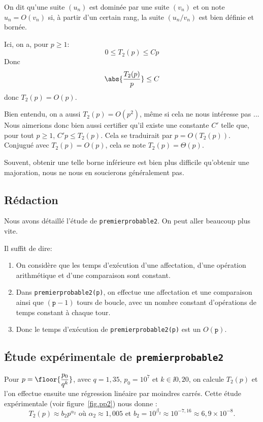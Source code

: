 \begin{defi}
  On dit qu'une suite $(u_{n})$ est dominée par une suite $(v_{n})$ et
  on note $u_{n} = O(v_{n})$ si,  à partir d'un certain rang, la suite
  $(u_{n}/v_{n})$ est bien définie et bornée.  
\end{defi}

Ici, on a, pour $p\geq 1$:
\begin{equation*}
  0 \leq T_{2}(p) \leq C p
\end{equation*}
Donc
\begin{equation*}
  \abs{\frac{T_{2}(p)}{p}} \leq C
\end{equation*}
donc $T_{2}(p)=O(p)$.

\begin{rem}
  Bien entendu, on a aussi $T_2(p) = O(p^2)$, même si cela ne nous intéresse pas ... Nous aimerions donc bien aussi certifier qu'il existe une constante $C'$ telle que, pour tout $p\geq 1$, $C'p \leq T_2(p)$. 
  Cela se traduirait par $p = O(T_2(p))$. Conjugué avec $T_2(p) = O(p)$, cela se note $T_2(p) =\Theta(p)$. 
  
  Souvent, obtenir une telle borne inférieure est bien plus difficile qu'obtenir une majoration, nous ne nous en soucierons généralement pas. 
\end{rem}


\subsection{Rédaction}
Nous avons détaillé l'étude de \texttt{premierprobable2}. On peut aller
beaucoup plus vite.

Il suffit de dire:

\begin{enumerate}
\item On considère que les temps d'exécution d'une affectation, d'une
  opération arithmétique et d'une comparaison sont constant.
\item Dans \texttt{premierprobable2(p)}, on effectue une affectation et
  une comparaison ainsi que $(\texttt{p}-1)$ tours de boucle, avec un
  nombre constant d'opérations de temps constant à chaque tour.
\item Donc le temps d'exécution de \texttt{premierprobable2(p)} est un
  $O(\texttt{p})$.
\end{enumerate}

\subsection{Étude expérimentale de \texttt{premierprobable2}}
  Pour $p = \floor{\dfrac{p_0}{q^k}}$, avec $q = 1,35$, $p_0 = 10^7$ et $k\in\ii{0,20}$, on calcule $T_2(p)$ et l'on effectue ensuite une régression linéaire par moindres carrés. Cette étude expérimentale (voir figure~\ref{fig.pp2}) nous donne :
\begin{equation*}
  T_{2}(p)\approx b_{2} p^{\alpha_{2}}
  \text{ où }\alpha_{2}\approx 1,005
  \text{ et }b_{2} = 10^{\beta_{2}} \approx 10^{-7,16}\approx 6,9\times 10^{-8}.
\end{equation*}

